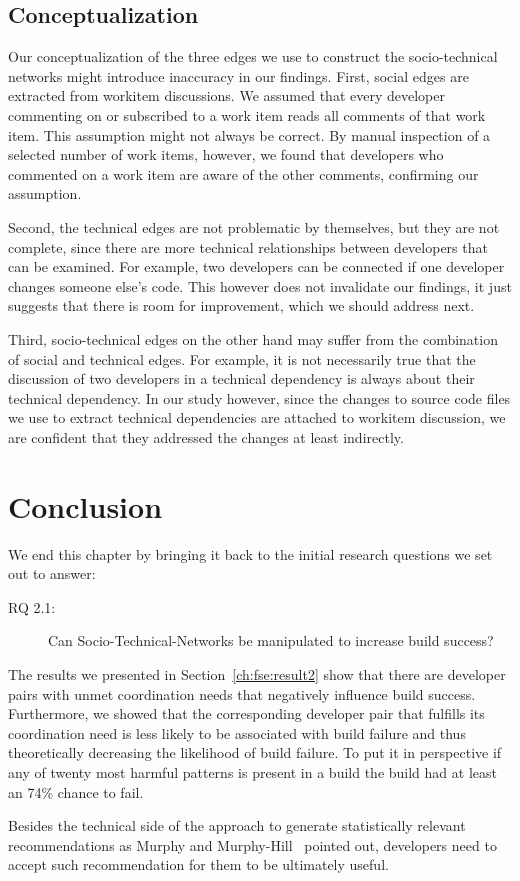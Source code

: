 \subsection{Conceptualization}
Our conceptualization of the three edges we use to construct the
socio-technical networks might introduce inaccuracy in our findings.
First, social edges are extracted from workitem discussions. We assumed that
every developer commenting on or subscribed to a work item reads all comments of that
work item. This assumption might not always be correct. By manual inspection of
a selected number of work items, however, we found that developers who
commented on a work item are aware of the other comments, confirming our assumption.

Second, the technical edges are not problematic by themselves, but they are not
complete, since there are more technical relationships between developers that
can be examined. For example, two developers can be connected if one developer
changes someone else's code. This however does not invalidate our findings, it
just suggests that there is room for improvement, which we should address
next.

Third, socio-technical edges on the other hand may suffer from the combination of
social and technical edges. For example, it is not necessarily true that the
discussion of  two developers in a technical dependency is always about their
technical dependency. 
In our study however, since the changes to
source code files we use to extract technical dependencies are attached to workitem discussion, we are
confident that they addressed the changes at least indirectly.



\section{Conclusion}
\label{sec:conclusions}
We end this chapter by bringing it back to the initial research questions we set out to answer:
\begin{description}
  \item[RQ 2.1:] Can Socio-Technical-Networks be manipulated to increase build success? 
\end{description}

The results we presented in Section~\ref{ch:fse:result2} show that there are developer pairs with unmet coordination needs that negatively influence build success.
Furthermore, we showed that the corresponding developer pair that fulfills its coordination need is less likely to be associated with build failure and thus theoretically decreasing the likelihood of build failure.
To put it in perspective if any of twenty most harmful patterns is present in a build the build had at least an 74\% chance to fail.

Besides the technical side of the approach to generate statistically relevant recommendations as Murphy and Murphy-Hill~\cite{murphy:rsse:2010} pointed out, developers need to accept such recommendation for them to be ultimately useful.